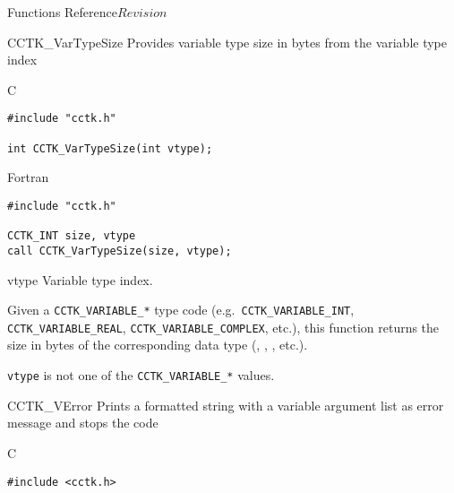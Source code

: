 \begin{cactuspart}{ Functions Reference}{}{$Revision$}
\begin{FunctionDescription}{CCTK\_VarTypeSize}
\label{CCTK-VarTypeSize}
Provides variable type size in bytes from the variable type index

\begin{SynopsisSection}
\begin{Synopsis}{C}
\begin{verbatim}
#include "cctk.h"

int CCTK_VarTypeSize(int vtype);
\end{verbatim}
\end{Synopsis}
\begin{Synopsis}{Fortran}
\begin{verbatim}
#include "cctk.h"

CCTK_INT size, vtype
call CCTK_VarTypeSize(size, vtype);
\end{verbatim}
\end{Synopsis}
\end{SynopsisSection}

\begin{ParameterSection}
\begin{Parameter}{vtype}
Variable type index.
\end{Parameter}
\end{ParameterSection}

\begin{Discussion}
Given a \verb|CCTK_VARIABLE_*| type code (e.g.~\verb|CCTK_VARIABLE_INT|,
\verb|CCTK_VARIABLE_REAL|, \verb|CCTK_VARIABLE_COMPLEX|, etc.), this
function returns the size in bytes of the corresponding data type
(, , , etc.).
\end{Discussion}

\begin{ErrorSection}
\begin{Error}{-1}
\verb|vtype| is not one of the \verb|CCTK_VARIABLE_*| values.
\end{Error}
\end{ErrorSection}
\end{FunctionDescription}


\begin{FunctionDescription}{CCTK\_VError}
\label{CCTK-VError}
Prints a formatted string with a variable argument list as error
message and stops the code

\begin{SynopsisSection}
\begin{Synopsis}{C}
\begin{verbatim}
#include <cctk.h>


\end{verbatim}
\end{Synopsis}
\end{SynopsisSection}
\end{FunctionDescription}
\end{cactuspart}

